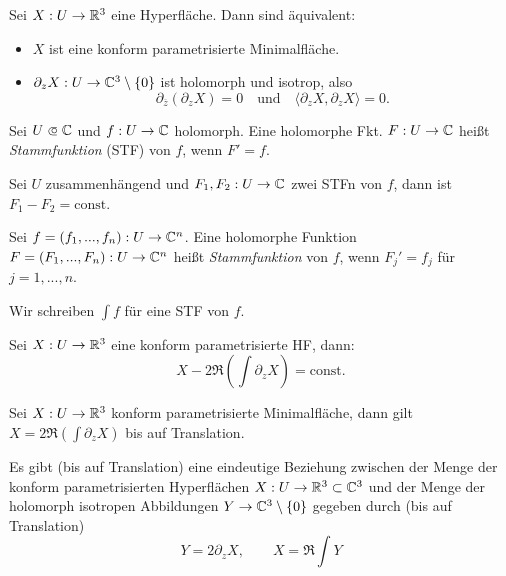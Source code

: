 \documentclass{cheat-sheet}
\begin{document}
\begin{lem}
  Sei $X : U \to \mathbb{R}^3$ eine Hyperfläche. Dann sind äquivalent:
  \begin{itemize}
    \item $X$ ist eine konform parametrisierte Minimalfläche.
    \item $\partial_z X : U \to \mathbb{C}^3 \setminus \{ 0 \}$ ist holomorph und isotrop, also
    \[
      \partial_{\overline{z}} (\partial_z X) = 0
      \quad \text{und} \quad
      \langle \partial_z X, \partial_z X \rangle = 0.
    \]
  \end{itemize}
\end{lem}


\begin{defn}
  Sei $U \opn \C$ und $f : U \to \mathbb{C}$ holomorph. Eine holomorphe Fkt. $F : U \to \mathbb{C}$ heißt \emph{Stammfunktion} (STF) von $f$, wenn $F' = f$.
\end{defn}

\begin{bem}
  Sei $U$ zusammenhängend und $F_1, F_2 : U \to \mathbb{C}$ zwei STFn von $f$, dann ist $F_1 - F_2 = \mathrm{const}$.
\end{bem}

\begin{defn}
  Sei $f = (f_1, ..., f_n) : U \to \mathbb{C}^n$. Eine holomorphe Funktion $F = (F_1, ..., F_n) : U \to \mathbb{C}^n$ heißt \emph{Stammfunktion} von $f$, wenn $F_j' = f_j$ für $j = 1, ..., n$.
\end{defn}

\begin{nota}
  Wir schreiben ${\textstyle \int} f$ für eine STF von $f$.
\end{nota}

\begin{lem}
  Sei $X : U \to \mathbb{R}^3$ eine konform parametrisierte HF, dann:
  \[ X - 2 \Re \left( {\textstyle \int} \partial_z X \right) = \mathrm{const}. \]
\end{lem}

\begin{bem}
  Sei $X : U \to \mathbb{R}^3$ konform parametrisierte Minimalfläche, dann gilt $X = 2 \Re \left( {\textstyle \int} \partial_z X \right)$ bis auf Translation.
\end{bem}

\begin{satz}
  Es gibt (bis auf Translation) eine eindeutige Beziehung zwischen der Menge der konform parametrisierten Hyperflächen $X : U \to \mathbb{R}^3 \subset \mathbb{C}^3$ und der Menge der holomorph isotropen Abbildungen $Y \to \mathbb{C}^3 \setminus \{ 0 \}$ gegeben durch (bis auf Translation)
  \[ Y = 2 \partial_z X, \qquad X = \Re {\textstyle \int} Y \]
\end{satz}
\end{document}
